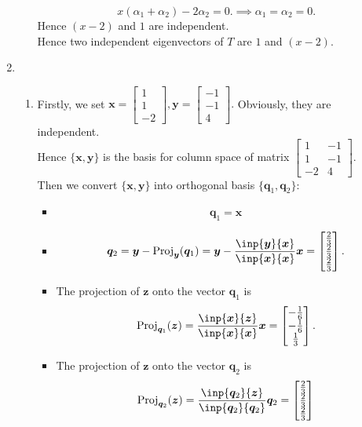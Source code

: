 \begin{enumerate}
\begin{enumerate}
\[
x(\alpha_1+\alpha_2)-2\alpha_2=0.\implies
\alpha_1=\alpha_2=0.
\]
Hence $(x-2)$ and $1$ are independent.\\
Hence two independent eigenvectors of $T$ are $1$ and $(x-2)$.
\end{enumerate}
\item
\begin{enumerate}
\item
Firstly, we set $\bm x=\begin{bmatrix}
1\\1\\-2
\end{bmatrix},\bm y=\begin{bmatrix}
-1\\-1\\4
\end{bmatrix}.$ 
Obviously, they are independent. \\Hence $\{\bm x,\bm y\}$ is the basis for column space of matrix $\begin{bmatrix}
1&-1\\1&-1\\-2&4
\end{bmatrix}.$\\
Then we convert $\{\bm x,\bm y\}$ into orthogonal basis $\{\bm q_1,\bm q_2\}$:
\begin{itemize}
\item
\[
\bm q_1=\bm x
\]
\item
\[
\bm q_2=\bm y-\Proj_{\bm y}(\bm q_1)=\bm y-\frac{\inp{\bm y}{\bm x}}{\inp{\bm x}{\bm x}}\bm x
=\begin{bmatrix}
\frac{2}{3}\\\frac{2}{3}\\\frac{2}{3}
\end{bmatrix}.
\]
\end{itemize}
\begin{itemize}
\item
The projection of $\bm z$ onto the vector $\bm q_1$ is 
\[
\Proj_{\bm q_1}(\bm z)=\frac{\inp{\bm x}{\bm z}}{\inp{\bm x}{\bm x}}\bm x=\begin{bmatrix}
-\frac{1}{6}\\-\frac{1}{6}\\\frac{1}{3}
\end{bmatrix}.
\]
\item
The projection of $\bm z$ onto the vector $\bm q_2$ is 
\[
\Proj_{\bm q_2}(\bm z)=\frac{\inp{\bm q_2}{\bm z}}{\inp{\bm q_2}{\bm q_2}}\bm q_2=\begin{bmatrix}
\frac{2}{3}\\\frac{2}{3}\\\frac{2}{3}

\end{bmatrix}\]
\end{itemize}
\end{enumerate}
\end{enumerate}
